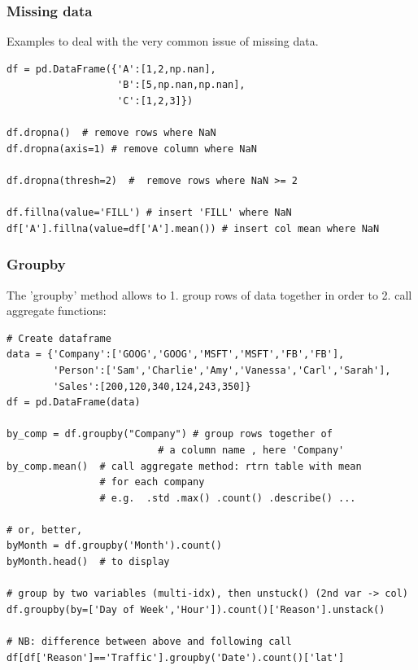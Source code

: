 \documentclass[11pt]{article}
\begin{document}
\subsubsection{Missing data} 
Examples to deal with the very common issue of missing data.
\begin{lstlisting}
df = pd.DataFrame({'A':[1,2,np.nan], 
                   'B':[5,np.nan,np.nan],
                   'C':[1,2,3]})

df.dropna()  # remove rows where NaN
df.dropna(axis=1) # remove column where NaN

df.dropna(thresh=2)  #  remove rows where NaN >= 2

df.fillna(value='FILL') # insert 'FILL' where NaN
df['A'].fillna(value=df['A'].mean()) # insert col mean where NaN 
\end{lstlisting}

\subsubsection{Groupby}
The 'groupby' method allows to 1. group rows of data together in order to 2. call aggregate functions:
\begin{lstlisting}
# Create dataframe
data = {'Company':['GOOG','GOOG','MSFT','MSFT','FB','FB'],
        'Person':['Sam','Charlie','Amy','Vanessa','Carl','Sarah'],
        'Sales':[200,120,340,124,243,350]}
df = pd.DataFrame(data)

by_comp = df.groupby("Company") # group rows together of 
                          # a column name , here 'Company'
by_comp.mean()  # call aggregate method: rtrn table with mean 
                # for each company
                # e.g.  .std .max() .count() .describe() ...
                
# or, better,
byMonth = df.groupby('Month').count()
byMonth.head()  # to display

# group by two variables (multi-idx), then unstuck() (2nd var -> col)
df.groupby(by=['Day of Week','Hour']).count()['Reason'].unstack()

# NB: difference between above and following call 
df[df['Reason']=='Traffic'].groupby('Date').count()['lat']
\end{lstlisting}
\end{document}
